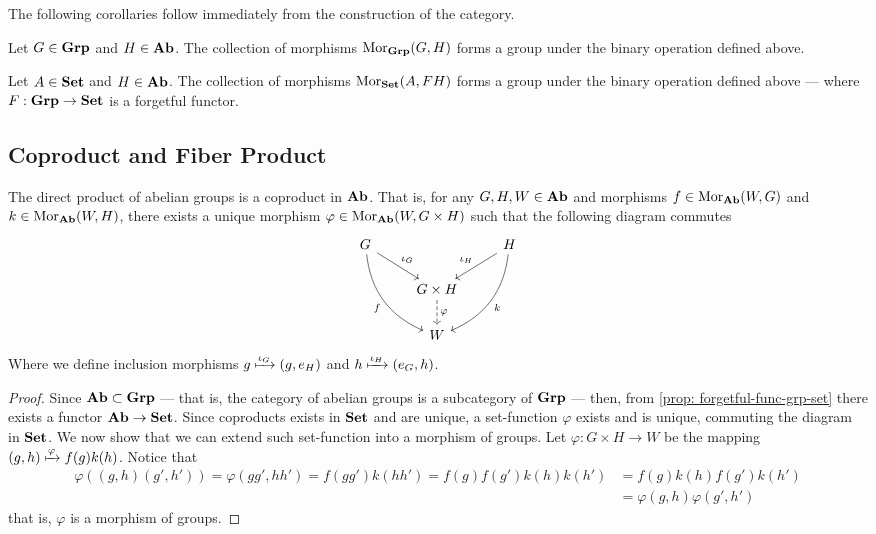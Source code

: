 The following corollaries follow immediately from the construction of the
category.

\begin{corollary}
Let \(G \in {\textbf{Grp}}\) and \(H \in {\textbf{Ab}}\). The collection of morphisms
\(\operatorname{Mor}_{\textbf{Grp}}(G, H)\) forms a group under the binary operation defined above.
\end{corollary}

\begin{corollary}
Let \(A \in {\textbf{Set}}\) and \(H \in {\textbf{Ab}}\). The collection of morphisms
\(\operatorname{Mor}_{\textbf{Set}}(A, FH)\) forms a group under the binary operation defined above
--- where \(F: {\textbf{Grp}} \to {\textbf{Set}}\) is a forgetful functor.
\end{corollary}

\subsection{Coproduct and Fiber Product}

\begin{proposition}[Coproduct in \(\Ab\)]\label{prop: coprod-ab}
The direct product of abelian groups is a coproduct in \(\Ab\). That is, for
any \(G, H, W \in {\textbf{Ab}}\) and morphisms \(f \in \operatorname{Mor}_{\textbf{Ab}}(W, G)\) and \(k \in
\operatorname{Mor}_{\textbf{Ab}}(W, H)\), there exists a unique morphism \(\varphi \in \operatorname{Mor}_{\textbf{Ab}}(W, G
\times H)\) such that the following diagram commutes
\[
  \begin{tikzcd}
    G \ar[dr, "\iota_G"] \ar[ddr, bend right, swap, "f"] &
    &H \ar[dl, swap, "\iota_H"] \ar[ddl, bend left, "k"] \\
    &G \times H \ar[d, dashed, "\varphi"]  & \\
    &W &
  \end{tikzcd}
\]
Where we define inclusion morphisms \(g \xmapsto{\iota_G} (g, e_H)\) and \(h
\xmapsto{\iota_H} (e_G, h)\).
\end{proposition}

\begin{proof}
Since \({\textbf{Ab}} \subset {\textbf{Grp}}\) --- that is, the category of abelian groups is a
subcategory of \({\textbf{Grp}}\) --- then, from \cref{prop: forgetful-func-grp-set}
there exists a functor \({\textbf{Ab}} \to {\textbf{Set}}\). Since coproducts exists in \({\textbf{Set}}\)
and are unique, a set-function \(\varphi\) exists and is unique, commuting the
diagram in \({\textbf{Set}}\). We now show that we can extend such set-function into a
morphism of groups. Let \(\varphi: G \times H \to W\) be the mapping \((g, h)
\xmapsto \varphi f(g) k(h)\). Notice that
\begin{align*}
  \varphi((g, h)(g', h'))
  = \varphi(gg', hh')
  = f(g g') k(hh')
  = f(g) f(g') k(h) k(h')
  &= f(g) k(h) f(g') k(h') \\
  &= \varphi(g, h) \varphi(g', h')
\end{align*}
that is, \(\varphi\) is a morphism of groups.
\end{proof}

